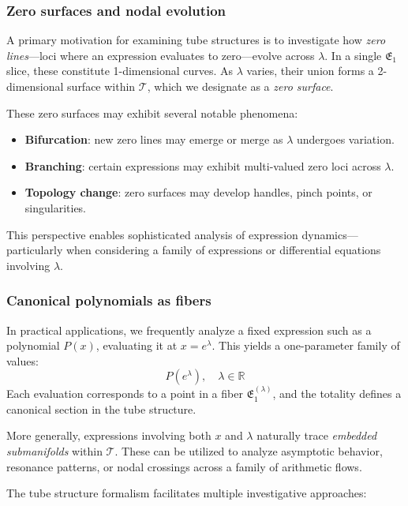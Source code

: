 \subsubsection{Zero surfaces and nodal evolution}

A primary motivation for examining tube structures is to investigate how \emph{zero lines}—loci where an expression evaluates to zero—evolve across $\lambda$. In a single $\mathfrak{E}_1$ slice, these constitute 1-dimensional curves. As $\lambda$ varies, their union forms a 2-dimensional surface within $\mathcal{T}$, which we designate as a \emph{zero surface}.

These zero surfaces may exhibit several notable phenomena:
\begin{itemize}
\item \textbf{Bifurcation}: new zero lines may emerge or merge as $\lambda$ undergoes variation.
\item \textbf{Branching}: certain expressions may exhibit multi-valued zero loci across $\lambda$.
\item \textbf{Topology change}: zero surfaces may develop handles, pinch points, or singularities.
\end{itemize}

This perspective enables sophisticated analysis of expression dynamics—particularly when considering a family of expressions or differential equations involving $\lambda$.

\subsubsection{Canonical polynomials as fibers}

In practical applications, we frequently analyze a fixed expression such as a polynomial $P(x)$, evaluating it at $x=e^\lambda$. This yields a one-parameter family of values:
\begin{equation}
P(e^\lambda), \quad \lambda \in \mathbb{R}
\end{equation}
Each evaluation corresponds to a point in a fiber $\mathfrak{E}_1^{(\lambda)}$, and the totality defines a canonical section in the tube structure.

More generally, expressions involving both $x$ and $\lambda$ naturally trace \emph{embedded submanifolds} within $\mathcal{T}$. These can be utilized to analyze asymptotic behavior, resonance patterns, or nodal crossings across a family of arithmetic flows.

The tube structure formalism facilitates multiple investigative approaches:

